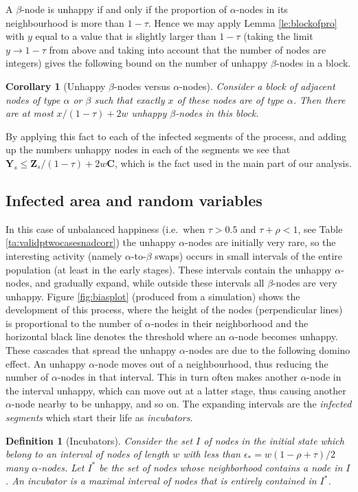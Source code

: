 \documentclass[11pt]{article}
\theoremstyle{plain}
\newtheorem{coro}[thm]{Corollary}
\newtheorem{defi}[thm]{Definition}
\numberwithin{equation}{subsection}
\newcommand{\ZZ}{\mathbf{Z}}
\newcommand{\YY}{\mathbf{Y}}
\newcommand{\CC}{\mathbf{C}}
\begin{document}
A $\beta$-node is unhappy if and only if the proportion of $\alpha$-nodes in its 
neighbourhood is more than $1-\tau$. Hence we may apply Lemma \ref{le:blockofpro}
with $y$ equal to a value that is slightly larger than $1-\tau$ (taking the limit $y\to 1-\tau$ from above
and taking into account that the number of nodes are integers) gives the following bound on the number of
unhappy $\beta$-nodes in a block.

\begin{coro}[Unhappy $\beta$-nodes versus $\alpha$-nodes]
\label{le:redvsunhapgr}
Consider a block of adjacent nodes 
of type $\alpha$ or $\beta$ such that exactly $x$ of these 
nodes are of type $\alpha$.
Then there are at most $x/(1-\tau)+2w$ unhappy $\beta$-nodes in this block.
\end{coro}

By applying this fact to each of the infected segments of the process, and adding up the numbers
unhappy nodes in each of the segments we see that $\YY_s\leq\ZZ_s/(1-\tau)+2w\CC$, which is the fact used
in the main part of our analysis. 

\subsection{Infected area and random variables}
In this case of unbalanced happiness (i.e.\ when $\tau>0.5$ and $\tau+\rho<1$, see Table \ref{ta:validptwocasesnadcorr})
the unhappy $\alpha$-nodes are initially very rare, so the interesting activity (namely $\alpha$-to-$\beta$ swaps) occurs
in small intervals of the entire population (at least in the early stages). 
These intervals contain the unhappy $\alpha$-nodes, and gradually expand, while outside these intervals
all $\beta$-nodes are very unhappy. 
Figure \ref{fig:biasplot} (produced from a simulation) 
shows the development of this process, where the height of the nodes (perpendicular lines) is proportional to
the number of $\alpha$-nodes in their neighborhood and the horizontal black line denotes the threshold where an $\alpha$-node  becomes unhappy.
These cascades that spread the unhappy $\alpha$-nodes are due to the following domino effect. An unhappy 
$\alpha$-node moves out of a neighbourhood, thus reducing the number of $\alpha$-nodes in that interval. This
in turn often makes another $\alpha$-node in the interval unhappy, which can move out at a latter stage, thus
causing another $\alpha$-node nearby to be unhappy, and so on.
The expanding intervals are the {\em infected segments} which start their life as {\em incubators}.
\begin{defi}[Incubators]\label{de:infectincuba}
Consider the set $I$ of nodes in the initial state which 
belong to an interval of nodes of length $w$ with less than
$\epsilon_{\ast}=w(1-\rho+\tau)/2$ many $\alpha$-nodes.
Let $I^{\ast}$ be the set of nodes whose neighborhood  contains a node in $I$.
 An incubator is a maximal interval of nodes
that is entirely contained in $I^{\ast}$.
\end{defi}
\end{document}
